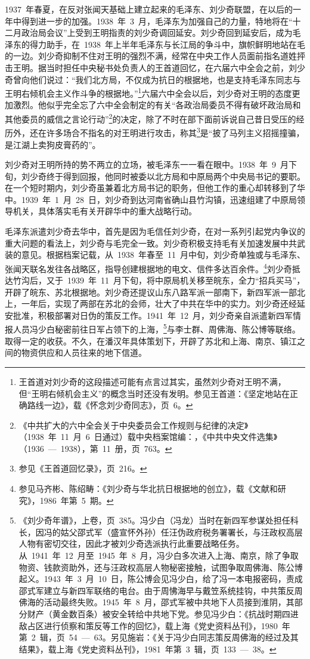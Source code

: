 1937~年春夏，在反对张闻天基础上建立起来的毛泽东、刘少奇联盟，在以后的一年中得到进一步的加强。1938~年~3~月，毛泽东为加强自己的力量，特地将在“十二月政治局会议”上受到王明指责的刘少奇调回延安。刘少奇回到延安后，成为毛泽东的得力助手，在~1938~年上半年毛泽东与长江局的争斗中，旗帜鲜明地站在毛的一边。刘少奇抑制不住对王明的强烈不满，经常在中央工作人员面前指名道姓抨击王明。据当时担任中央秘书处负责人的王首道回忆，在六届六中全会之前，刘少奇曾向他们说过：“我们北方局，不仅成为抗日的根据地，也是支持毛泽东同志与王明右倾机会主义作斗争的根据地。”\footnote{王首道对刘少奇的这段描述可能有点言过其实，虽然刘少奇对王明不满，但“王明右倾机会主义”的概念当时还没有发明。参见王首道：《坚定地站在正确路线一边》，载《怀念刘少奇同志》，页~6。}六届六中全会以后，刘少奇对王明的态度更加激烈。他似乎完全忘了六中全会制定的有关“各政治局委员不得有破坏政治局和其他委员的威信之言论行动”\footnote{《中共扩大的六中全会关于中央委员会工作规则与纪律的决定》（1938~年~11~月~6~日通过）载中央档案馆编：，《中共中央文件选集》（1936~—~1938），第~11~册，页~763。}的决定，除了不时在部下面前诉说自己昔日受压的经历外，还在许多场合不指名的对王明进行攻击，称其\footnote{参见《王首道回忆录》，页~216。}是“披了马列主义招摇撞骗，是江湖上卖狗皮膏药的”。

刘少奇对王明所持的势不两立的立场，被毛泽东一一看在眼中。1938~年~9~月下旬，刘少奇终于得到回报，他同时被委以北方局和中原局两个中央局书记的要职。在一个短时期内，刘少奇虽兼着北方局书记的职务，但他工作的重心却转移到了华中。1939~年~1~月~28~日，刘少奇到达河南省确山县竹沟镇，迅速组建了中原局领导机关，具体落实毛有关开辟华中的重大战略行动。

毛泽东派遣刘少奇去华中，首先是因为毛信任刘少奇，在对一系列引起党内争议的重大问题的看法上，刘少奇与毛完全一致。刘少奇积极支持毛有关加速发展中共武装的意见。根据档案记载，从~1938~年春至~11~月中旬，刘少奇单独或与毛泽东、张闻天联名发往各战略区，指导创建根据地的电文、信件多达百余件。\footnote{参见马齐彬、陈绍畴：《刘少奇与华北抗日根据地的创立》，载《文献和研究》，1986~年第~5~期。}刘少奇抵达竹沟后，又于~1939~年~11~月下旬，将中原局机关移至皖东，全力“招兵买马”，开辟了皖东、苏北根据地。刘少奇还提议山东八路军派一部南下，新四军派一部北上，一年后，实现了两部在苏北的会师，壮大了中共在华中的实力。刘少奇还经延安批准，积极部署对日伪的策反工作。1941~年~12~月，刘少奇亲自派遣新四军情报人员冯少白秘密前往日军占领下的上海，\footnote{《刘少奇年谱》，上卷，页~385。冯少白（冯龙）当时在新四军参谋处担任科长，因冯的姑父邵式军（盛宣怀外孙）任汪伪政府税务署署长，与汪政权高层人物有密切交往，因此才被刘少奇选派执行此重要战略任务。从~1941~年~12~月至~1945~年~8~月，冯少白多次进入上海、南京，除了争取物资、钱款资助外，还与汪政权高层人物秘密接触，试图争取周佛海、陈公博起义。1943~年~3~月~10~日，陈公博会见冯少白，给了冯一本电报密码，责成邵式军建立与新四军联络的电台。由于周怫海早与戴笠系统挂钩，中共策反周佛海的活动最终失败。1945~年~8~月，邵式军被中共地下人员接到淮阴，其部分财产（黄金数百条）被安全转给中共地下党。参见冯少白：《抗战时期四进敌占区进行侦察和策反等工作的回忆》，载上海《党史资料丛刊》，1980~年第~2~辑，页~54~—~63。另见施岩：《关于冯少白同志策反周佛海的经过及其结果》，载上海《党史资料丛刊》，1981~年第~3~辑，页~133~—~38。}与李士群、周佛海、陈公博等联络。取得一定的收获。不久，在潘汉年具体策划下，开辟了苏北和上海、南京、镇江之间的物资供应和人员往来的地下信道。

